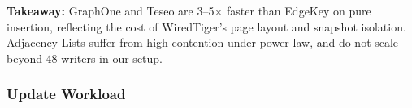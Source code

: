 
\textbf{Takeaway:} GraphOne and Teseo are 3--5$\times$ faster than \project{} EdgeKey on pure insertion, reflecting the cost of WiredTiger's page layout and snapshot isolation.
\project{} Adjacency Lists suffer from high contention under power-law, and do not scale beyond 48 writers in our setup.


\subsubsection{Update Workload}


